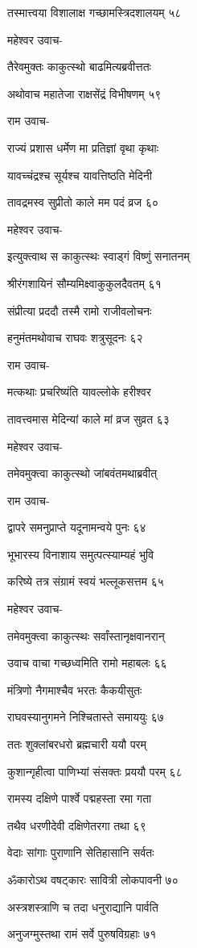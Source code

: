 तस्मात्त्वया विशालाक्ष गच्छामस्त्रिदशालयम् ५८

महेश्वर उवाच-

तैरेवमुक्तः काकुत्स्थो बाढमित्यब्रवीत्ततः

अथोवाच महातेजा राक्षसेंद्रं विभीषणम् ५९

राम उवाच-

राज्यं प्रशास धर्मेण मा प्रतिज्ञां वृथा कृथाः

यावच्चंद्रश्च सूर्यश्च यावत्तिष्ठति मेदिनी

तावद्रमस्व सुप्रीतो काले मम पदं व्रज ६०

महेश्वर उवाच-

इत्युक्त्वाथ स काकुत्स्थः स्वाड्गं विष्णुं सनातनम्

श्रीरंगशायिनं सौम्यमिक्ष्वाकुकुलदैवतम् ६१

संप्रीत्या प्रददौ तस्मै रामो राजीवलोचनः

हनुमंतमथोवाच राघवः शत्रुसूदनः ६२

राम उवाच-

मत्कथाः प्रचरिष्यंति यावल्लोके हरीश्वर

तावत्त्वमास मेदिन्यां काले मां व्रज सुव्रत ६३

महेश्वर उवाच-

तमेवमुक्त्वा काकुत्स्थो जांबवंतमथाब्रवीत्

राम उवाच-

द्वापरे समनुप्राप्ते यदूनामन्वये पुनः ६४

भूभारस्य विनाशाय समुत्पत्स्याम्यहं भुवि

करिष्ये तत्र संग्रामं स्वयं भल्लूकसत्तम ६५

महेश्वर उवाच-

तमेवमुक्त्वा काकुत्स्थः सर्वांस्तानृक्षवानरान्

उवाच वाचा गच्छध्वमिति रामो महाबलः ६६

मंत्रिणो नैगमाश्चैव भरतः कैकयीसुतः

राघवस्यानुगमने निश्चितास्ते समाययुः ६७

ततः शुक्लांबरधरो ब्रह्मचारी ययौ परम्

कुशान्गृहीत्वा पाणिभ्यां संसक्तः प्रययौ परम् ६८

रामस्य दक्षिणे पार्श्वे पद्महस्ता रमा गता

तथैव धरणीदेवी दक्षिणेतरगा तथा ६९

वेदाः सांगाः पुराणानि सेतिहासानि सर्वतः

ॐकारोऽथ वषट्कारः सावित्री लोकपावनी ७०

अस्त्रशस्त्राणि च तदा धनुराद्यानि पार्वति

अनुजग्मुस्तथा रामं सर्वे पुरुषविग्रहाः ७१

